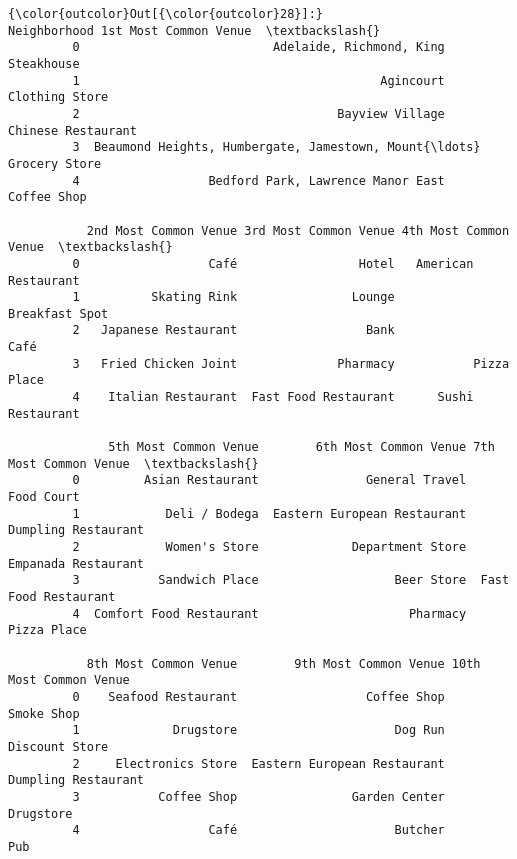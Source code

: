 \documentclass[11pt]{article}
\begin{document}
\begin{Verbatim}[commandchars=\\\{\}]
{\color{outcolor}Out[{\color{outcolor}28}]:}                                         Neighborhood 1st Most Common Venue  \textbackslash{}
         0                           Adelaide, Richmond, King            Steakhouse   
         1                                          Agincourt        Clothing Store   
         2                                    Bayview Village    Chinese Restaurant   
         3  Beaumond Heights, Humbergate, Jamestown, Mount{\ldots}         Grocery Store   
         4                  Bedford Park, Lawrence Manor East           Coffee Shop   
         
           2nd Most Common Venue 3rd Most Common Venue 4th Most Common Venue  \textbackslash{}
         0                  Café                 Hotel   American Restaurant   
         1          Skating Rink                Lounge        Breakfast Spot   
         2   Japanese Restaurant                  Bank                  Café   
         3   Fried Chicken Joint              Pharmacy           Pizza Place   
         4    Italian Restaurant  Fast Food Restaurant      Sushi Restaurant   
         
              5th Most Common Venue        6th Most Common Venue 7th Most Common Venue  \textbackslash{}
         0         Asian Restaurant               General Travel            Food Court   
         1            Deli / Bodega  Eastern European Restaurant   Dumpling Restaurant   
         2            Women's Store             Department Store   Empanada Restaurant   
         3           Sandwich Place                   Beer Store  Fast Food Restaurant   
         4  Comfort Food Restaurant                     Pharmacy           Pizza Place   
         
           8th Most Common Venue        9th Most Common Venue 10th Most Common Venue  
         0    Seafood Restaurant                  Coffee Shop             Smoke Shop  
         1             Drugstore                      Dog Run         Discount Store  
         2     Electronics Store  Eastern European Restaurant    Dumpling Restaurant  
         3           Coffee Shop                Garden Center              Drugstore  
         4                  Café                      Butcher                    Pub  
\end{Verbatim}
            

    
    
    
    
\end{document}
